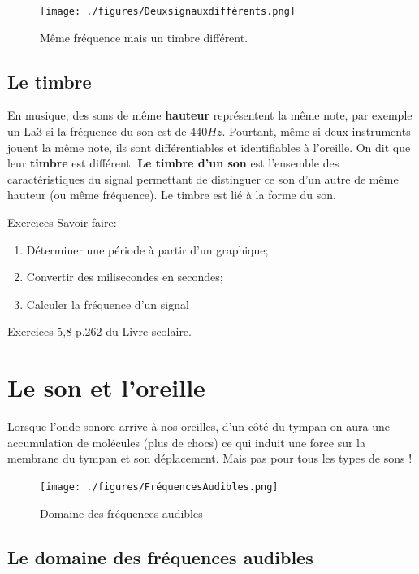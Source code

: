 \documentclass[french]{article}
\begin{document}
\begin{figure}%
	\centering
	\vspace{-1cm}
	\texttt{[image: ./figures/Deuxsignauxdifférents.png]}
	\caption{Même fréquence mais un timbre différent.}
\end{figure}
\subsection{Le timbre}

En musique, des sons de même \textbf{hauteur} représentent la même note, par exemple un La3 si la fréquence du son est de $440 Hz$. Pourtant, même si deux instruments jouent la même note, ils sont différentiables et identifiables à l'oreille. On dit que leur \textbf{timbre} est différent. \textbf{Le timbre d'un son} est l'ensemble des caractéristiques du signal permettant de distinguer ce son d'un autre de même hauteur (ou même fréquence). Le timbre est lié à la forme du son.\medskip


\begin{Exercice}{Exercices}
	Savoir faire:
	\begin{enumerate}
		\item Déterminer une période à partir d'un graphique;
		\item Convertir des milisecondes en secondes;
		\item Calculer la fréquence d'un signal
	\end{enumerate}
	Exercices 5,8 p.262 du Livre scolaire.
\end{Exercice}

\section{Le son et l'oreille}


Lorsque l'onde sonore arrive à nos oreilles, d'un côté du tympan on aura une accumulation de molécules (plus de chocs) ce qui induit une force sur la membrane du tympan et son déplacement. Mais pas pour tous les types de sons !

\begin{figure}
	\centering
	\texttt{[image: ./figures/FréquencesAudibles.png]}
	\caption{Domaine des fréquences audibles}
\end{figure}

\subsection{Le domaine des fréquences audibles}
\end{document}
